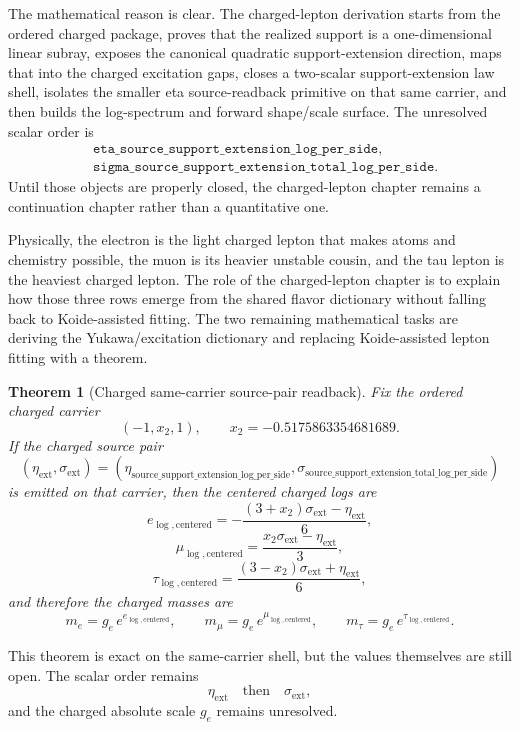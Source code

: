 \documentclass[11pt]{article}
\newtheorem{theorem}{Theorem}[section]
\begin{document}
The mathematical reason is clear. The charged-lepton derivation starts from
the ordered charged package, proves that the realized support is a one-dimensional linear subray,
exposes the canonical quadratic support-extension direction, maps that into the charged
excitation gaps, closes a two-scalar support-extension law shell, isolates the smaller eta
source-readback primitive on that same carrier, and then builds the log-spectrum and forward
shape/scale surface. The unresolved scalar order is
\[
\begin{aligned}
&\texttt{eta\_source\_support\_extension\_log\_per\_side},\\
&\texttt{sigma\_source\_support\_extension\_total\_log\_per\_side}.
\end{aligned}
\]
Until those objects are properly closed, the charged-lepton chapter remains a
continuation chapter rather than a quantitative one.

Physically, the electron is the light charged lepton that makes atoms and chemistry possible, the
muon is its heavier unstable cousin, and the tau lepton is the heaviest charged lepton. The role
of the charged-lepton chapter is to explain how those three rows emerge from the shared flavor dictionary without falling back to Koide-assisted fitting. The two
remaining mathematical tasks are deriving the Yukawa/excitation
dictionary and replacing Koide-assisted lepton fitting with a theorem.

\begin{theorem}[Charged same-carrier source-pair readback]
Fix the ordered charged carrier
\[
(-1,x_2,1),
\qquad
x_2=-0.5175863354681689.
\]
If the charged source pair
\[
(\eta_{\mathrm{ext}},\sigma_{\mathrm{ext}})
=
(\eta_{\mathrm{source\_support\_extension\_log\_per\_side}},
\sigma_{\mathrm{source\_support\_extension\_total\_log\_per\_side}})
\]
is emitted on that carrier, then the centered charged logs are
\[
e_{\log,\mathrm{centered}}
=
-\frac{(3+x_2)\sigma_{\mathrm{ext}}-\eta_{\mathrm{ext}}}{6},
\]
\[
\mu_{\log,\mathrm{centered}}
=
\frac{x_2\sigma_{\mathrm{ext}}-\eta_{\mathrm{ext}}}{3},
\]
\[
\tau_{\log,\mathrm{centered}}
=
\frac{(3-x_2)\sigma_{\mathrm{ext}}+\eta_{\mathrm{ext}}}{6},
\]
and therefore the charged masses are
\[
m_e = g_e\,e^{e_{\log,\mathrm{centered}}},
\qquad
m_\mu = g_e\,e^{\mu_{\log,\mathrm{centered}}},
\qquad
m_\tau = g_e\,e^{\tau_{\log,\mathrm{centered}}}.
\]
\end{theorem}

This theorem is exact on the same-carrier shell, but the values themselves are still open.
The scalar order remains
\[
\eta_{\mathrm{ext}}
\quad\text{then}\quad
\sigma_{\mathrm{ext}},
\]
and the charged absolute scale \(g_e\) remains unresolved.
\end{document}
